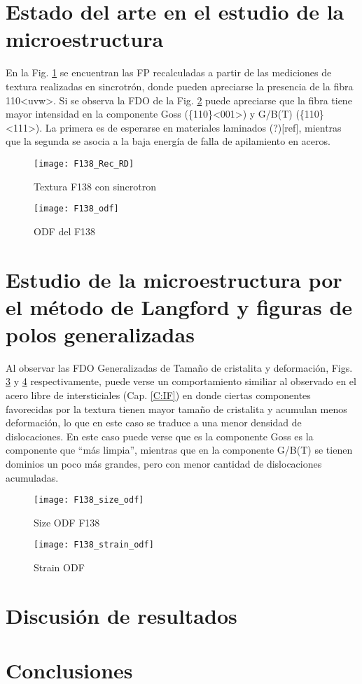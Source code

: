 \section{Estado del arte en el estudio de la microestructura}\label{S:F138Nati}
En la Fig. \ref{fig:F138PF} se encuentran las FP recalculadas a partir de las mediciones de textura realizadas en sincrotrón, donde pueden apreciarse la presencia de la fibra {110}\textless uvw\textgreater.
Si se observa la FDO de la Fig. \ref{fig:F138ODF} puede apreciarse que la fibra tiene mayor intensidad en la componente Goss (\{110\}\textless 001\textgreater) y G/B(T) (\{110\}\textless 111\textgreater).
La primera es de esperarse en materiales laminados (?)[ref], mientras que la segunda se asocia a la baja energía de falla de apilamiento en aceros\cite{Sathiaraj2015,Saleh2012}.

\begin{figure}[!htb]
  \centering
  \texttt{[image: F138\_Rec\_RD]}
  \caption{Textura F138 con sincrotron}
  \label{fig:F138PF}
\end{figure}


\begin{figure}[!htb]
  \centering
  \texttt{[image: F138\_odf]}
  \caption{ODF del F138}
  \label{fig:F138ODF}
\end{figure}


\newpage
\section{Estudio de la microestructura por el método de Langford y figuras de polos generalizadas}\label{S:F138LANG}
Al observar las FDO Generalizadas de Tamaño de cristalita y deformación, Figs. \ref{fig:F138Size} y \ref{fig:F138Strain} respectivamente, puede verse un comportamiento similiar al observado en el acero libre de intersticiales (Cap. \ref{C:IF}) en donde ciertas componentes favorecidas por la textura tienen mayor tamaño de cristalita y acumulan menos deformación, lo que en este caso se traduce a una menor densidad de dislocaciones.
En este caso puede verse que es la componente Goss es la componente que ``más limpia'', mientras que en la componente G/B(T) se tienen dominios un poco más grandes, pero con menor cantidad de dislocaciones acumuladas.
\begin{figure}[!htb]
  \centering
  \texttt{[image: F138\_size\_odf]}
  \caption{Size ODF F138}
  \label{fig:F138Size}
\end{figure}

\begin{figure}[!htb]
  \centering
  \texttt{[image: F138\_strain\_odf]}
  \caption{Strain ODF}
  \label{fig:F138Strain}
\end{figure}




\newpage
\section{Discusión de resultados}\label{S:F138Dis}
\newpage
\section{Conclusiones}\label{S:F138Conclusiones}
